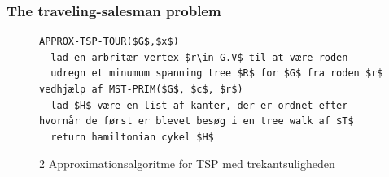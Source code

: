 \subsubsection{The traveling-salesman problem}
\begin{figure}[ht]
    \centering
\begin{lstlisting}
APPROX-TSP-TOUR($G$,$x$)
  lad en arbritær vertex $r\in G.V$ til at være roden
  udregn et minumum spanning tree $R$ for $G$ fra roden $r$ vedhjælp af MST-PRIM($G$, $c$, $r$)
  lad $H$ være en list af kanter, der er ordnet efter hvornår de først er blevet besøg i en tree walk af $T$
  return hamiltonian cykel $H$
\end{lstlisting}
    \caption{2 Approximationsalgoritme for TSP med trekantsuligheden \label{fig:approx-tsp-tour}}
\end{figure}

